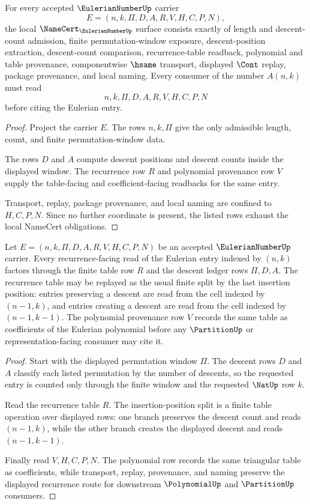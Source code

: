 \begin{theorem}
\label{thm:eulerian-number-namecert-obligations}
For every accepted $\EulerianNumberUp$ carrier
$$
E=(n,k,\Pi,D,A,R,V,H,C,P,N),
$$
the local $\NameCert_{\EulerianNumberUp}$ surface consists exactly of length and descent-count admission, finite permutation-window exposure, descent-position extraction, descent-count comparison, recurrence-table readback, polynomial and table provenance, componentwise $\hsame$ transport, displayed $\Cont$ replay, package provenance, and local naming. Every consumer of the number $A(n,k)$ must read
$$
n,k,\Pi,D,A,R,V,H,C,P,N
$$
before citing the Eulerian entry.
\end{theorem}
\begin{proof}
Project the carrier $E$. The rows $n,k,\Pi$ give the only admissible length, count, and finite permutation-window data.

The rows $D$ and $A$ compute descent positions and descent counts inside the displayed window. The recurrence row $R$ and polynomial provenance row $V$ supply the table-facing and coefficient-facing readbacks for the same entry.

Transport, replay, package provenance, and local naming are confined to $H,C,P,N$. Since no further coordinate is present, the listed rows exhaust the local NameCert obligations.
\end{proof}

\begin{theorem}
\label{thm:eulerian-number-descent-recurrence}
Let $E=(n,k,\Pi,D,A,R,V,H,C,P,N)$ be an accepted $\EulerianNumberUp$ carrier. Every recurrence-facing read of the Eulerian entry indexed by $(n,k)$ factors through the finite table row $R$ and the descent ledger rows $\Pi,D,A$. The recurrence table may be replayed as the usual finite split by the last insertion position: entries preserving a descent are read from the cell indexed by $(n-1,k)$, and entries creating a descent are read from the cell indexed by $(n-1,k-1)$. The polynomial provenance row $V$ records the same table as coefficients of the Eulerian polynomial before any $\PartitionUp$ or representation-facing consumer may cite it.
\end{theorem}
\begin{proof}
Start with the displayed permutation window $\Pi$. The descent rows $D$ and $A$ classify each listed permutation by the number of descents, so the requested entry is counted only through the finite window and the requested $\NatUp$ row $k$.

Read the recurrence table $R$. The insertion-position split is a finite table operation over displayed rows: one branch preserves the descent count and reads $(n-1,k)$, while the other branch creates the displayed descent and reads $(n-1,k-1)$.

Finally read $V,H,C,P,N$. The polynomial row records the same triangular table as coefficients, while transport, replay, provenance, and naming preserve the displayed recurrence route for downstream $\PolynomialUp$ and $\PartitionUp$ consumers.
\end{proof}

